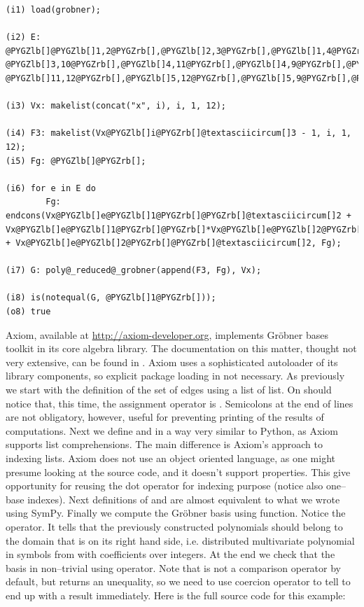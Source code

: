 \begin{Verbatim}[commandchars=@\[\]]
(i1) load(grobner);

(i2) E: @PYGZlb[]@PYGZlb[]1,2@PYGZrb[],@PYGZlb[]2,3@PYGZrb[],@PYGZlb[]1,4@PYGZrb[],@PYGZlb[]1,6@PYGZrb[],@PYGZlb[]1,12@PYGZrb[],@PYGZlb[]2,5@PYGZrb[],@PYGZlb[]2,7@PYGZrb[],@PYGZlb[]3,8@PYGZrb[],
@PYGZlb[]3,10@PYGZrb[],@PYGZlb[]4,11@PYGZrb[],@PYGZlb[]4,9@PYGZrb[],@PYGZlb[]5,6@PYGZrb[],@PYGZlb[]6,7@PYGZrb[],@PYGZlb[]7,8@PYGZrb[],@PYGZlb[]8,9@PYGZrb[],@PYGZlb[]9,10@PYGZrb[],@PYGZlb[]10,11@PYGZrb[],
@PYGZlb[]11,12@PYGZrb[],@PYGZlb[]5,12@PYGZrb[],@PYGZlb[]5,9@PYGZrb[],@PYGZlb[]6,10@PYGZrb[],@PYGZlb[]7,11@PYGZrb[],@PYGZlb[]8,12@PYGZrb[]@PYGZrb[];

(i3) Vx: makelist(concat("x", i), i, 1, 12);

(i4) F3: makelist(Vx@PYGZlb[]i@PYGZrb[]@textasciicircum[]3 - 1, i, 1, 12);
(i5) Fg: @PYGZlb[]@PYGZrb[];

(i6) for e in E do
        Fg: endcons(Vx@PYGZlb[]e@PYGZlb[]1@PYGZrb[]@PYGZrb[]@textasciicircum[]2 + Vx@PYGZlb[]e@PYGZlb[]1@PYGZrb[]@PYGZrb[]*Vx@PYGZlb[]e@PYGZlb[]2@PYGZrb[]@PYGZrb[] + Vx@PYGZlb[]e@PYGZlb[]2@PYGZrb[]@PYGZrb[]@textasciicircum[]2, Fg);

(i7) G: poly@_reduced@_grobner(append(F3, Fg), Vx);

(i8) is(notequal(G, @PYGZlb[]1@PYGZrb[]));
(o8) true
\end{Verbatim}
\noindent
Axiom, available at \href{http://axiom-developer.org}{http://axiom-developer.org}, implements Gröbner bases toolkit in its
core algebra library. The documentation on this matter, thought not very extensive, can be found in
\cite{Daly2003horizon}. Axiom uses a sophisticated autoloader of its library components, so explicit package
loading in not necessary.  As previously we start with the definition of the set of edges using a list of
list. On should notice that, this time, the assignment operator is \code{:=}. Semicolons at the end of lines
are not obligatory, however, useful for preventing printing of the results of computations. Next we define
 and  in a way very similar to Python, as Axiom supports list comprehensions. The main difference
is Axiom's approach to indexing lists. Axiom does not use an object oriented language, as one might presume
looking at the source code, and it doesn't support properties. This give opportunity for reusing the dot
operator for indexing purpose (notice also one--base indexes). Next definitions of  and  are
almost equivalent to what we wrote using SymPy. Finally we compute the Gröbner basis using 
function. Notice the \code{::} operator. It tells that the previously constructed polynomials should belong
to the domain that is on its right hand side, i.e. distributed multivariate polynomial in symbols from
 with coefficients over integers. At the end we check that the basis in non--trivial using \code{\textasciitilde{}=}
operator. Note that \code{\textasciitilde{}=} is not a comparison operator by default, but returns an unequality, so we
need to use coercion operator  to tell \code{\textasciitilde{}=} to end up with a  result immediately.
Here is the full source code for this example:

